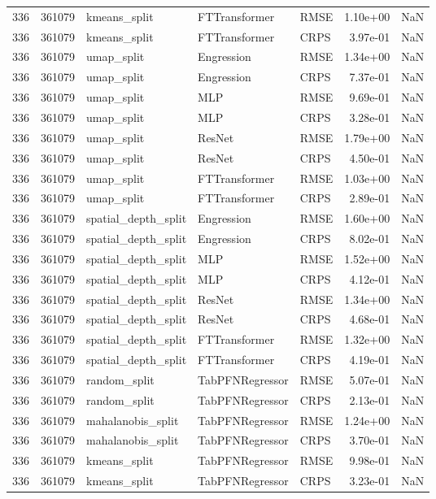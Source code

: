 \begin{tabular}{rrlllrr}
336 & 361079 & kmeans\_split & FTTransformer & RMSE & 1.10e+00 & NaN \\
336 & 361079 & kmeans\_split & FTTransformer & CRPS & 3.97e-01 & NaN \\
336 & 361079 & umap\_split & Engression & RMSE & 1.34e+00 & NaN \\
336 & 361079 & umap\_split & Engression & CRPS & 7.37e-01 & NaN \\
336 & 361079 & umap\_split & MLP & RMSE & 9.69e-01 & NaN \\
336 & 361079 & umap\_split & MLP & CRPS & 3.28e-01 & NaN \\
336 & 361079 & umap\_split & ResNet & RMSE & 1.79e+00 & NaN \\
336 & 361079 & umap\_split & ResNet & CRPS & 4.50e-01 & NaN \\
336 & 361079 & umap\_split & FTTransformer & RMSE & 1.03e+00 & NaN \\
336 & 361079 & umap\_split & FTTransformer & CRPS & 2.89e-01 & NaN \\
336 & 361079 & spatial\_depth\_split & Engression & RMSE & 1.60e+00 & NaN \\
336 & 361079 & spatial\_depth\_split & Engression & CRPS & 8.02e-01 & NaN \\
336 & 361079 & spatial\_depth\_split & MLP & RMSE & 1.52e+00 & NaN \\
336 & 361079 & spatial\_depth\_split & MLP & CRPS & 4.12e-01 & NaN \\
336 & 361079 & spatial\_depth\_split & ResNet & RMSE & 1.34e+00 & NaN \\
336 & 361079 & spatial\_depth\_split & ResNet & CRPS & 4.68e-01 & NaN \\
336 & 361079 & spatial\_depth\_split & FTTransformer & RMSE & 1.32e+00 & NaN \\
336 & 361079 & spatial\_depth\_split & FTTransformer & CRPS & 4.19e-01 & NaN \\
336 & 361079 & random\_split & TabPFNRegressor & RMSE & 5.07e-01 & NaN \\
336 & 361079 & random\_split & TabPFNRegressor & CRPS & 2.13e-01 & NaN \\
336 & 361079 & mahalanobis\_split & TabPFNRegressor & RMSE & 1.24e+00 & NaN \\
336 & 361079 & mahalanobis\_split & TabPFNRegressor & CRPS & 3.70e-01 & NaN \\
336 & 361079 & kmeans\_split & TabPFNRegressor & RMSE & 9.98e-01 & NaN \\
336 & 361079 & kmeans\_split & TabPFNRegressor & CRPS & 3.23e-01 & NaN \\

\end{tabular}
